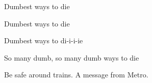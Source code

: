 \begin{song}
\bigskip

Dumbest ways to die  \par
{}Dumbest ways to die  \par
{}Dumbest ways to di-i-i-ie \par
{}So many dumb, so many dumb ways to die \par

\bigskip

Be safe around trains. A message from Metro. \par

\end{song}
